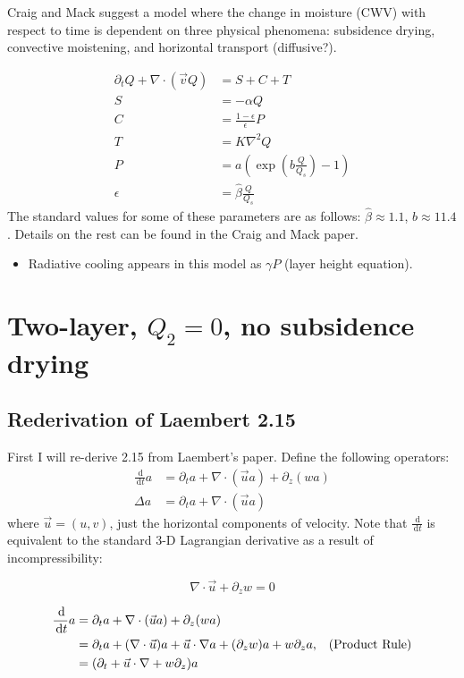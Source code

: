 \documentclass[10pt]{article}
\newcommand{\rmd}{\,\mathrm{d}}
\begin{document}
Craig and Mack suggest a model where the change in moisture (CWV) with respect to time is dependent on three physical phenomena: subsidence drying, convective moistening, and horizontal transport (diffusive?). 

\begin{align}
\partial_t Q + \nabla \cdot \left(\vec{v}Q\right) &= S + C + T\\
S &= -\alpha Q \\
C &= \frac{1-\epsilon}{\epsilon} P \\
T &= K \nabla^2 Q\\
P &= a \left(\exp(b\frac{Q}{Q_s}) -1\right)\\
\epsilon &= \hat{\beta} \frac{Q}{Q_s}
\end{align}
The standard values for some of these parameters are as follows: $\hat{\beta} \approx 1.1$, $b \approx 11.4$. Details on the rest can be found in the Craig and Mack paper.

\begin{itemize}
	\item Radiative cooling appears in this model as $\gamma P$ (layer height equation).
\end{itemize}

\section{Two-layer, $Q_2 = 0$, no subsidence drying}

\subsection{Rederivation of Laembert 2.15}
First I will re-derive 2.15 from Laembert's paper. Define the following operators:
\begin{align*}
\frac{\rmd}{\rmd t} a &= \partial_t a + \nabla \cdot \left(\vec{u}a\right) + \partial_z (wa)\\
\Delta a &= \partial_t a + \nabla \cdot \left(\vec{u}a\right)
\end{align*}
 where $\vec{u} = (u,v)$, just the horizontal components of velocity.
 Note that $\frac{\rmd}{\rmd t}$ is equivalent to the standard 3-D Lagrangian derivative as a result of  incompressibility: 
 
\begin{equation}
\nabla \cdot \vec{u} +\partial_z w= 0
\label{incoma}
\end{equation}
 
\begin{align*}
\frac{\rmd}{\rmd t} a &= \partial_t a + \nabla \cdot \left(\vec{u}a\right) + \partial_z (wa)\\
&= \partial_t a + (\nabla \cdot \vec{u}) a + \vec{u} \cdot \nabla a + (\partial_z w)a + w \partial_z a  \text{,\quad (Product Rule)}\\
&= (\partial_t  +\vec{u} \cdot \nabla  +w \partial_z) a
\end{align*}
 
\end{document}
